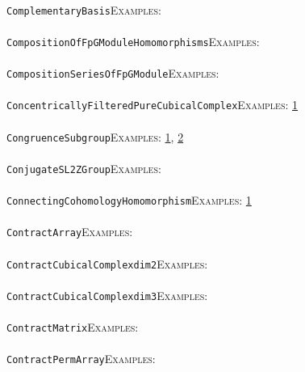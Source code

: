 \documentclass[a4paper,11pt]{report}
\begin{document}
{{ \\
 \texttt{ComplementaryBasis}{\nobreakspace}{\nobreakspace}{\nobreakspace}{\nobreakspace}\textsc{Examples:} \\
 \\
 \texttt{CompositionOfFpGModuleHomomorphisms}{\nobreakspace}{\nobreakspace}{\nobreakspace}{\nobreakspace}\textsc{Examples:} \\
 \\
 \texttt{CompositionSeriesOfFpGModule}{\nobreakspace}{\nobreakspace}{\nobreakspace}{\nobreakspace}\textsc{Examples:} \\
 \\
 \texttt{ConcentricallyFilteredPureCubicalComplex}{\nobreakspace}{\nobreakspace}{\nobreakspace}{\nobreakspace}\textsc{Examples:} \href{../www/SideLinks/About/aboutPersistent.html} {1}{\nobreakspace} \\
 \\
 \texttt{CongruenceSubgroup}{\nobreakspace}{\nobreakspace}{\nobreakspace}{\nobreakspace}\textsc{Examples:} \href{tutorial/chap10.html} {1}{\nobreakspace}, \href{../www/SideLinks/About/aboutArithmetic.html} {2}{\nobreakspace} \\
 \\
 \texttt{ConjugateSL2ZGroup}{\nobreakspace}{\nobreakspace}{\nobreakspace}{\nobreakspace}\textsc{Examples:} \\
 \\
 \texttt{ConnectingCohomologyHomomorphism}{\nobreakspace}{\nobreakspace}{\nobreakspace}{\nobreakspace}\textsc{Examples:} \href{../www/SideLinks/About/aboutCoefficientSequence.html} {1}{\nobreakspace} \\
 \\
 \texttt{ContractArray}{\nobreakspace}{\nobreakspace}{\nobreakspace}{\nobreakspace}\textsc{Examples:} \\
 \\
 \texttt{ContractCubicalComplex{\textunderscore}dim2}{\nobreakspace}{\nobreakspace}{\nobreakspace}{\nobreakspace}\textsc{Examples:} \\
 \\
 \texttt{ContractCubicalComplex{\textunderscore}dim3}{\nobreakspace}{\nobreakspace}{\nobreakspace}{\nobreakspace}\textsc{Examples:} \\
 \\
 \texttt{ContractMatrix}{\nobreakspace}{\nobreakspace}{\nobreakspace}{\nobreakspace}\textsc{Examples:} \\
 \\
 \texttt{ContractPermArray}{\nobreakspace}{\nobreakspace}{\nobreakspace}{\nobreakspace}\textsc{Examples:} \\
}}
\end{document}
